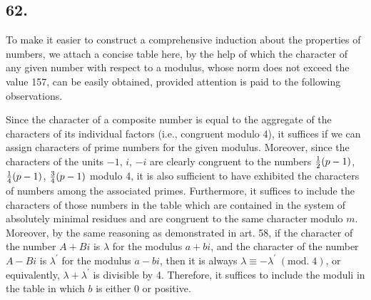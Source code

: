 \documentclass[twoside,12pt, showframe]{memoir}
\renewcommand{\pmod}[1]{\;(\textrm{mod.}\;#1)}
\let\oldfrac\frac
\def\frac#1#2{\mathchoice{\tfrac{#1}{#2}}{\oldfrac{#1}{#2}}{\genfrac{}{}{}{2}{#1}{#2\mathstrut}}{\genfrac{}{}{}{3}{#1}{#2\mathstrut}}}
\begin{document}
\subsection*{62.}
 
To make it easier to construct a comprehensive induction about the properties of numbers, we attach a concise table here, by the help of which the character of any given number with respect to a modulus, whose norm does not exceed the value 157, can be easily obtained, provided attention is paid to the following observations.
 
Since the character of a composite number is equal to the aggregate of the characters of its individual factors (i.e., congruent modulo 4), it suffices if we can assign characters of prime numbers for the given modulus. Moreover, since the characters of the units \(-1\), \( i\), \(-i\) are clearly congruent to the numbers \(\frac{1}{2}(p-1)\), \( \frac{1}{4}(p-1)\), \( \frac{3}{4}(p-1)\) modulo 4, it is also sufficient to have exhibited the characters of numbers among the associated primes. Furthermore, it suffices to include the characters of those numbers in the table which are contained in the system of absolutely minimal residues and are congruent to the same character modulo \(m\). Moreover, by the same reasoning as demonstrated in art. 58, if the character of the number \(A+B i\) is \(\lambda\) for the modulus \(a+b i\), and the character of the number \(A-B i\) is \(\lambda^{\prime}\) for the modulus \(a-b i\), then it is always \(\lambda \equiv-\lambda^{\prime}\pmod{4}\), or equivalently, \(\lambda+\lambda^{\prime}\) is divisible by 4. Therefore, it suffices to include the moduli in the table in which \(b\) is either 0 or positive.
%
\end{document}
